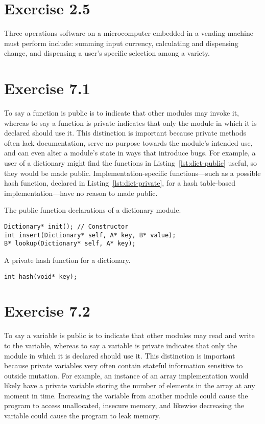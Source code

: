 \documentclass{abrice}
\begin{document}
\section{Exercise 2.5}

Three operations software on a microcomputer embedded in a vending machine must
perform include: summing input currency, calculating and dispensing change, and
dispensing a user's specific selection among a variety.

\section{Exercise 7.1}

To say a function is public is to indicate that other modules may invoke it,
whereas to say a function is private indicates that only the module in which it
is declared should use it. This distinction is important because private methods
often lack documentation, serve no purpose towards the module's intended use,
and can even alter a module's state in ways that introduce bugs. For example, a
user of a dictionary might find the functions in Listing~\ref{lst:dict-public}
useful, so they would be made public. Implementation-specific functions---such
as a possible hash function, declared in Listing~\ref{lst:dict-private}, for a
hash table-based implementation---have no reason to made public.

\begin{listing}
\caption{The public function declarations of a dictionary module.}
\label{lst:dict-public}
\begin{verbatim}
Dictionary* init(); // Constructor
int insert(Dictionary* self, A* key, B* value);
B* lookup(Dictionary* self, A* key);
\end{verbatim}
\end{listing}

\begin{listing}
\caption{A private hash function for a dictionary.}
\label{lst:dict-private}
\begin{verbatim}
int hash(void* key);
\end{verbatim}
\end{listing}

\section{Exercise 7.2}

To say a variable is public is to indicate that other modules may read and write
to the variable, whereas to say a variable is private indicates that only the
module in which it is declared should use it. This distinction is important
because private variables very often contain stateful information sensitive to
outside mutation. For example, an instance of an array implementation would
likely have a private variable storing the number of elements in the array at
any moment in time. Increasing the variable from another module could cause the
program to access unallocated, insecure memory, and likewise decreasing the
variable could cause the program to leak memory.
\end{document}
